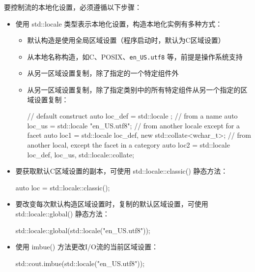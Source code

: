 
要控制流的本地化设置，必须遵循以下步骤：

\begin{itemize}
\item
使用 std::locale 类型表示本地化设置，构造本地化实例有多种方式：

\begin{itemize}
\item
默认构造是使用全局区域设置（程序启动时，默认为C区域设置）

\item
从本地名称构造，如C、POSIX、\verb|en_US.utf8| 等，前提是操作系统支持

\item
从另一区域设置复制，除了指定的一个特定组件外

\item
从另一区域设置复制，除了指定类别中的所有特定组件从另一个指定的区域设置复制：

\begin{cpp}
// default construct
auto loc_def = std::locale {};
// from a name
auto loc_us = std::locale {"en_US.utf8"};
// from another locale except for a facet
auto loc1 = std::locale {loc_def, new std::collate<wchar_t>};
// from another local, except the facet in a category
auto loc2 = std::locale {loc_def, loc_us, std::locale::collate};
\end{cpp}
\end{itemize}

\item
要获取默认C区域设置的副本，可使用 std::locale::classic() 静态方法：

\begin{cpp}
auto loc = std::locale::classic();
\end{cpp}

\item
要改变每次默认构造区域设置时，复制的默认区域设置，可使用 std::locale::global() 静态方法：

\begin{cpp}
std::locale::global(std::locale("en_US.utf8"));
\end{cpp}

\item
使用 imbue() 方法更改I/O流的当前区域设置：

\begin{cpp}
std::cout.imbue(std::locale("en_US.utf8"));
\end{cpp}
\end{itemize}

